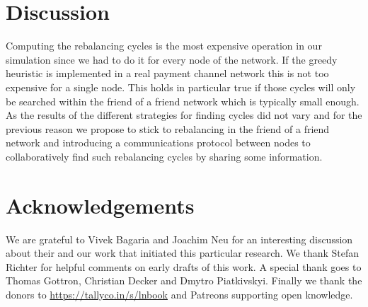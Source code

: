 \documentclass[conference]{IEEEtran}
\begin{document}
\section{Discussion}
\label{sec:conclusion}


Computing the rebalancing cycles is the most expensive operation in our simulation since we had to do it for every node of the network.
If the greedy heuristic is implemented in a real payment channel network this is not too expensive for a single node.
This holds in particular true if those cycles will only be searched within the friend of a friend network which is typically small enough.
As the results of the different strategies for finding cycles did not vary and for the previous reason we propose to stick to rebalancing in the friend of a friend network and introducing a communications protocol between nodes to collaboratively find such rebalancing cycles by sharing some information.


\section{Acknowledgements}
\label{sec:ack}
We are grateful to Vivek Bagaria and Joachim Neu for an interesting discussion about their and our work that initiated this particular research. We thank Stefan Richter for helpful comments on early drafts of this work. A special thank goes to Thomas Gottron, Christian Decker and Dmytro Piatkivskyi. Finally we thank the donors to \url{https://tallyco.in/s/lnbook} and Patreons supporting open knowledge. 



\end{document}
